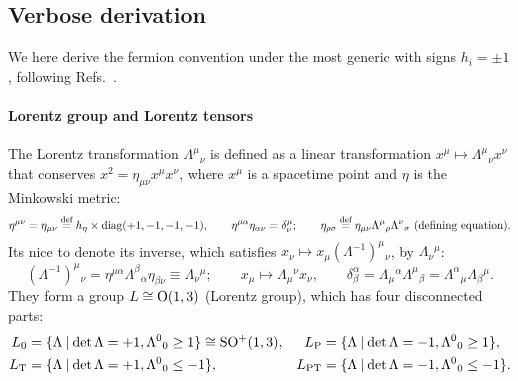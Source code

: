 \documentclass[CheatSheet]{subfiles}
\newcommand{\LorTr}[2]{\Lambda^{#1}{}_{#2}}
\newcommand\defeq{\mathrel{\stackrel{\text{def}}=}}
\begin{document}
\newpage
\detailstyle

\subsection{Verbose derivation}
We here derive the fermion convention under the most generic with signs $h_i=\pm1$, following
Refs.~\cite{Kugo1}.

\paragraph{Lorentz group and Lorentz tensors}
The Lorentz transformation $\LorTr\mu\nu$ is defined as a linear transformation $x^\mu\mapsto\LorTr\mu\nu x^\nu$ that conserves $x^2=\eta_{\mu\nu}x^\mu x^\nu$, where $x^\mu$ is a spacetime point and $\eta$ is the Minkowski metric:
\begin{equation}
 \eta^{\mu\nu}=\eta_{\mu\nu}\defeq h_\eta\times\diag(+1,-1,-1,-1),\qquad
 \eta^{\mu\alpha}\eta_{\alpha\nu}=\delta^{\mu}_\nu;\qquad
 \eta_{\rho\sigma}\defeq\eta_{\mu\nu}\LorTr\mu\rho\LorTr\nu\sigma ~\text{(defining equation)}.
\label{eq:LorTr}
\end{equation}
Its nice to denote its inverse, which satisfies $x_\nu\mapsto x_\mu(\Lambda^{-1})^\mu{}_\nu$, by $\Lambda_\nu{}^\mu$:
\begin{equation}
 (\Lambda^{-1})^\mu{}_\nu = \eta^{\mu\alpha}\LorTr\beta\alpha\eta_{\beta\nu}
\equiv \Lambda_\nu{}^\mu;\qquad
x_\mu\mapsto \Lambda_\mu{}^\nu x_\nu,\qquad
\delta^\alpha_\beta
=\Lambda_\mu{}^\alpha\LorTr\mu\beta
=\LorTr\alpha\mu \Lambda_\beta{}^\mu.
\end{equation}
They form a group $L\cong\operatorname{\mathrm O}(1,3)$ (Lorentz group), which has four disconnected parts:
\begin{align}
 L\w 0  &=\{\Lambda\mathbin|\det\Lambda=+1, \LorTr00\ge1\}\cong \mathop{\mathrm{SO^+}}(1,3),&
 L\w P  &=\{\Lambda\mathbin|\det\Lambda=-1, \LorTr00\ge1\},\notag\\
 L\w T  &=\{\Lambda\mathbin|\det\Lambda=+1, \LorTr00\le-1\},&
 L\w{PT}&=\{\Lambda\mathbin|\det\Lambda=-1, \LorTr00\le-1\}.
\end{align}
\end{document}
